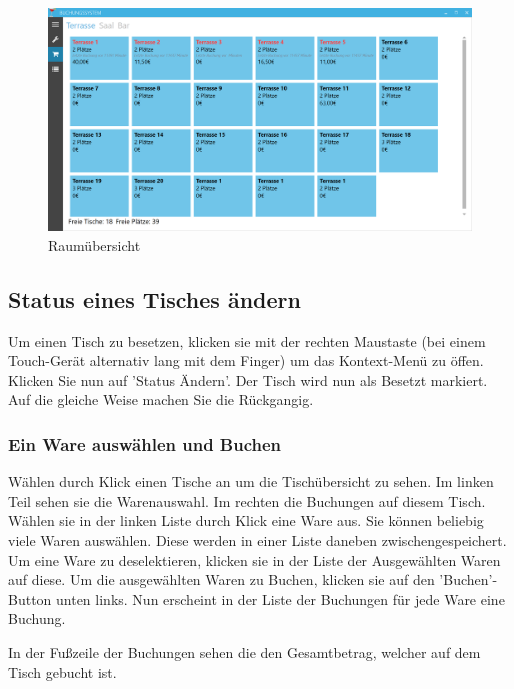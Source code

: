 \begin{figure}[h]
	\begin{center}
		\includegraphics[width=\columnwidth]{Benutzerhandbuch/Tischuebersicht.png}
	\end{center}
	\caption{Raumübersicht}
	\label{fig:room-overview}
\end{figure}


\subsection{Status eines Tisches ändern}

Um einen Tisch zu besetzen, klicken sie mit der rechten Maustaste (bei einem Touch-Gerät alternativ lang mit dem Finger) um das Kontext-Menü zu öffen. Klicken Sie nun auf 'Status Ändern'. 
Der Tisch wird nun als Besetzt markiert. Auf die gleiche Weise machen Sie die Rückgangig.

\subsubsection{Ein Ware auswählen und Buchen}

Wählen durch Klick einen Tische an um die Tischübersicht zu sehen. Im linken Teil sehen sie die Warenauswahl. Im rechten die Buchungen auf diesem Tisch. 
Wählen sie in der linken Liste durch Klick eine Ware aus. Sie können beliebig viele Waren auswählen. Diese werden in einer Liste daneben zwischengespeichert. Um eine Ware zu deselektieren, klicken sie in der Liste der Ausgewählten Waren auf diese.
Um die ausgewählten Waren zu Buchen, klicken sie auf den 'Buchen'-Button unten links. Nun erscheint in der Liste der Buchungen für jede Ware eine Buchung.

In der Fußzeile der Buchungen sehen die den Gesamtbetrag, welcher auf dem Tisch gebucht ist.

